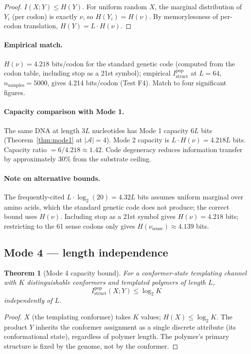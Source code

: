 \documentclass[11pt]{article}
\theoremstyle{plain}
\newtheorem{theorem}{Theorem}
\theoremstyle{definition}
\newcommand{\Istructpop}{I_{\mathrm{struct}}^{\mathrm{pop}}}
\begin{document}
\begin{proof}
$I(X; Y) \le H(Y)$. For uniform random $X$, the marginal distribution of $Y_i$ (per codon) is exactly $\nu$, so $H(Y_i) = H(\nu)$. By memorylessness of per-codon translation, $H(Y) = L \cdot H(\nu)$.
\end{proof}

\paragraph{Empirical match.} $H(\nu) = 4.218$ bits/codon for the standard genetic code (computed from the codon table, including stop as a 21st symbol); empirical $\Istructpop$ at $L = 64$, $n_{\mathrm{samples}} = 5000$, gives 4.214 bits/codon (Test F4). Match to four significant figures.

\paragraph{Capacity comparison with Mode 1.} The same DNA at length $3L$ nucleotides has Mode 1 capacity $6L$ bits (Theorem~\ref{thm:mode1} at $|\mathcal{A}| = 4$). Mode 2 capacity is $L \cdot H(\nu) = 4.218L$ bits. Capacity ratio $= 6/4.218 \approx 1.42$. Code degeneracy reduces information transfer by approximately 30\% from the substrate ceiling.

\paragraph{Note on alternative bounds.} The frequently-cited $L \cdot \log_2(20) = 4.32L$ bits assumes uniform marginal over amino acids, which the standard genetic code does not produce; the correct bound uses $H(\nu)$. Including stop as a 21st symbol gives $H(\nu) = 4.218$ bits; restricting to the 61 sense codons only gives $H(\nu_{\mathrm{sense}}) \approx 4.139$ bits.

\subsection{Mode 4 --- length independence}

\begin{theorem}[Mode 4 capacity bound]
\label{thm:mode4}
For a conformer-state templating channel with $K$ distinguishable conformers and templated polymers of length $L$,
\[
\Istructpop(X; Y) \le \log_2 K
\]
independently of $L$.
\end{theorem}

\begin{proof}
$X$ (the templating conformer) takes $K$ values; $H(X) \le \log_2 K$. The product $Y$ inherits the conformer assignment as a single discrete attribute (its conformational state), regardless of polymer length. The polymer's primary structure is fixed by the genome, not by the conformer.
\end{proof}
\end{document}
